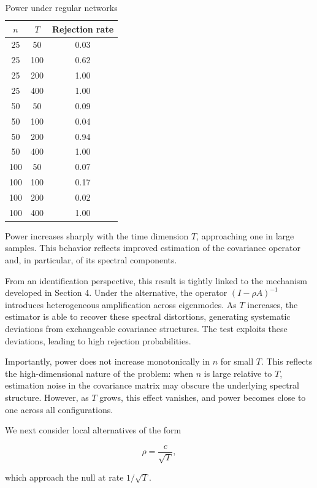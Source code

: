 \documentclass[12pt]{article}
\numberwithin{equation}{section}
\begin{document}
\begin{table}[H]
\centering
\caption{Power under regular networks}
\label{tab:power}
\begin{tabular}{ccc}
\toprule
$n$ & $T$ & Rejection rate \\
\midrule
25 & 50  & 0.03 \\
25 & 100 & 0.62 \\
25 & 200 & 1.00 \\
25 & 400 & 1.00 \\
50 & 50  & 0.09 \\
50 & 100 & 0.04 \\
50 & 200 & 0.94 \\
50 & 400 & 1.00 \\
100 & 50  & 0.07 \\
100 & 100 & 0.17 \\
100 & 200 & 0.02 \\
100 & 400 & 1.00 \\
\bottomrule
\end{tabular}
\end{table}

Power increases sharply with the time dimension $T$, approaching one in large samples. This behavior reflects improved estimation of the covariance operator and, in particular, of its spectral components.

From an identification perspective, this result is tightly linked to the mechanism developed in Section 4. Under the alternative, the operator $(I - \rho A)^{-1}$ introduces heterogeneous amplification across eigenmodes. As $T$ increases, the estimator is able to recover these spectral distortions, generating systematic deviations from exchangeable covariance structures. The test exploits these deviations, leading to high rejection probabilities.

Importantly, power does not increase monotonically in $n$ for small $T$. This reflects the high-dimensional nature of the problem: when $n$ is large relative to $T$, estimation noise in the covariance matrix may obscure the underlying spectral structure. However, as $T$ grows, this effect vanishes, and power becomes close to one across all configurations.

We next consider local alternatives of the form

\begin{equation}
\rho = \frac{c}{\sqrt{T}},
\end{equation}

which approach the null at rate $1/\sqrt{T}$.
\end{document}
